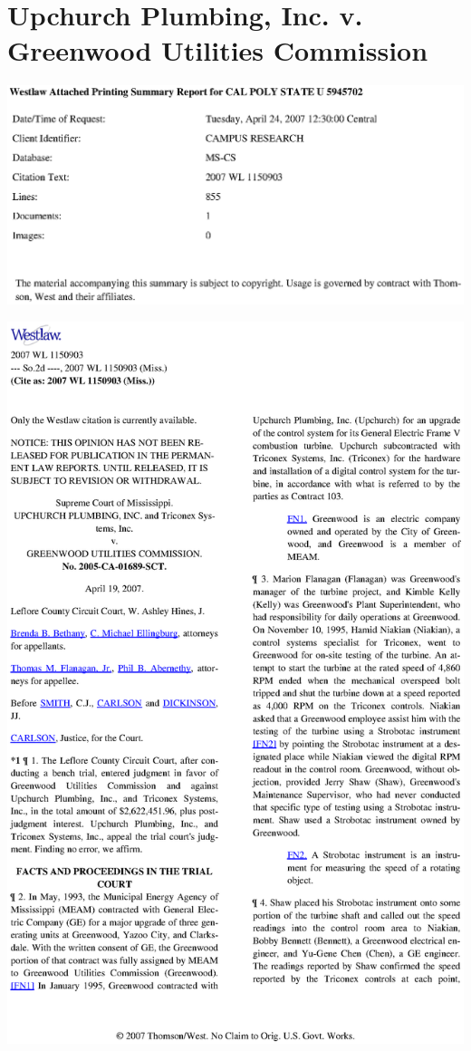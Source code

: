 \chapter{Upchurch Plumbing, Inc. v. Greenwood Utilities Commission}\label{A:case}
\begin{center}
\includegraphics{figures/case00.eps}
\end{center}
\newpage

\begin{center}
\includegraphics[scale=0.9]{figures/case01.eps}
\end{center}
\newpage

